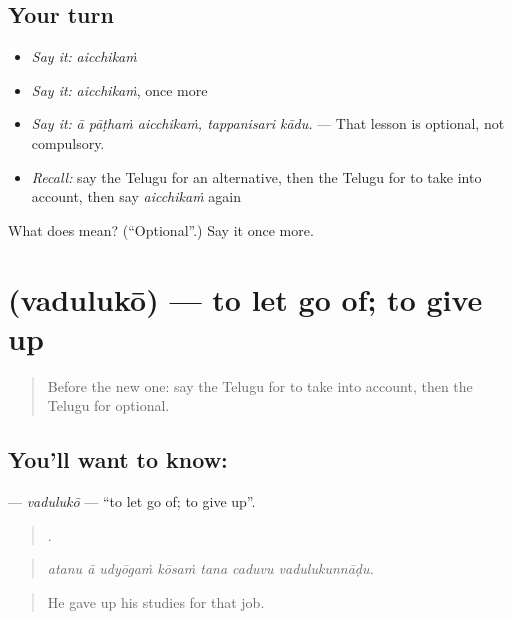 \subsection*{Your turn}
\begin{itemize}
\raggedright
  \item \emph{Say it:} \emph{aicchikaṁ}
  \item \emph{Say it:} \emph{aicchikaṁ}, once more
  \item \emph{Say it:} \emph{ā pāṭhaṁ aicchikaṁ, tappanisari kādu.} — That lesson is optional, not compulsory.
  \item \emph{Recall:} say the Telugu for an alternative, then the Telugu for to take into account, then say \emph{aicchikaṁ} again
\end{itemize}

\begin{tcolorbox}[breakable,colback=teal!4,colframe=teal!35!black,title={Before you move on}]
What does  mean? (\textquotedblleft{}Optional\textquotedblright{}.) Say it once more.
\end{tcolorbox}
\section[\texorpdfstring{\te{వదులుకో} (vadulukō)}{వదులుకో (vadulukō)}]{ (vadulukō) — to let go of; to give up}

\label{lesson:TE-C420-vaduluko}



\begin{quote}
Before the new one: say the Telugu for to take into account, then the Telugu for optional.
\end{quote}

\subsection*{You'll want to know: }
\textbf{} — \emph{vadulukō} — \textquotedblleft{}to let go of; to give up\textquotedblright{}.

\begin{quote}
      .
\end{quote}

\begin{quote}
\emph{atanu ā udyōgaṁ kōsaṁ tana caduvu vadulukunnāḍu.}
\end{quote}

\begin{quote}
He gave up his studies for that job.
\end{quote}

